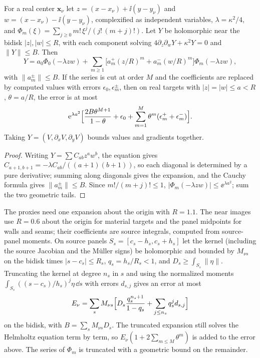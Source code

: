 \begin{lemma}\label{sm:lem-regular}
For a real center $\mathbf x_\nu$ let $z=(x-x_\nu)+\ii(y-y_\nu)$ and
$w=(x-x_\nu)-\ii(y-y_\nu)$, complexified as independent variables,
$\lambda=\kappa^2/4$, and $\Phi_m(\xi)=\sum_{j\ge0}m!\,\xi^j/(j!\,(m+j)!)$. Let $Y$ be
holomorphic near the bidisk $|z|,|w|\le R$, with each component solving
$4\partial_z\partial_wY+\kappa^2Y=0$ and $\|Y\|\le B$. Then
\[
  Y=a_0\Phi_0(-\lambda zw)+\sum_{m\ge1}\bigl[a_m^+(z/R)^m+a_m^-(w/R)^m\bigr]\Phi_m(-\lambda zw),
\]
with $\|a_m^\pm\|\le B$. If the series is cut at order $M$ and the coefficients are
replaced by computed values with errors $\epsilon_0,\epsilon_m^\pm$, then on real
targets with $|z|=|w|\le a<R$, $\theta=a/R$, the error is at most
\[
  \mathrm{e}^{\lambda a^2}\Bigl[\frac{2B\theta^{M+1}}{1-\theta}+\epsilon_0
  +\sum_{m=1}^M\theta^m(\epsilon_m^++\epsilon_m^-)\Bigr].
\]
Taking $Y=(V,\partial_xV,\partial_yV)$ bounds values and gradients together.
\end{lemma}

\begin{proof}
Writing $Y=\sum C_{ab}z^aw^b$, the equation gives
$C_{a+1,b+1}=-\lambda C_{ab}/((a+1)(b+1))$, so each diagonal is determined by a pure
derivative; summing along diagonals gives the expansion, and the Cauchy formula
gives $\|a_m^\pm\|\le B$. Since $m!/(m+j)!\le1$, $|\Phi_m(-\lambda zw)|\le
\ee^{\lambda a^2}$; sum the two geometric tails.
\end{proof}

The proxies need one expansion about the origin with $R=1.1$. The near images use
$R=0.6$ about the origin for material targets and the panel midpoints for walls and
seams; their coefficients are source integrals, computed from source-panel moments.
On source panels $S_s=[c_s-h_s,c_s+h_s]$ let the kernel (including the source
Jacobian and the Müller signs) be holomorphic and bounded by $M_{\nu s}$ on the
bidisk times $|s-c_s|\le R_s$, $q_s=h_s/R_s<1$, and $D_s\ge\int_{S_s}\|\eta\|$.
Truncating the kernel at degree $n_s$ in $s$ and using the normalized moments
$\int_{S_s}((s-c_s)/h_s)^j\eta\,\dd s$ with errors $d_{s,j}$ gives an error at most
\begin{equation}\label{sm:eq-moment}
  E_\nu=\sum_sM_{\nu s}\Bigl[D_s\frac{q_s^{n_s+1}}{1-q_s}+\sum_{j\le n_s}q_s^jd_{s,j}\Bigr]
\end{equation}
on the bidisk, with $B=\sum_sM_{\nu s}D_s$. The truncated expansion still solves the
Helmholtz equation term by term, so $E_\nu(1+2\sum_{m\le M}\theta^m)$ is added to the
error above. The series of $\Phi_m$ is truncated with a geometric bound on the
remainder.

